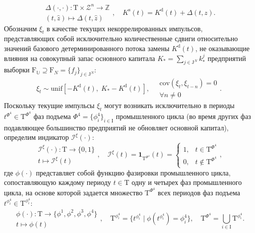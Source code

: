 \begin{equation}\begin{aligned} \Delta (\cdot, \cdot) : \mathrm{T} \times \mathcal{Z}^{n} \longrightarrow \mathbb{Z} \\ (t, \hat{z}) \longmapsto \Delta (t, \hat{z}) \end{aligned}, \quad K^{\mathrm{s}}(t) = K^{\mathrm{d}}(t) + \Delta (t, \hat{z}).\end{equation}
Обозначим $\xi_{t}$ в качестве текущих некоррелированных импульсов, представляющих собой исключительно количественные сдвиги относительно значений базового детерминированного потока замены $K^{\mathrm{d}}(t)$, не оказывающие влияния на совокупный запас основного капитала $K_{*} = \sum_{j \in \mathrm{J}^{N}} k^{j}_{*}$ предприятий выборки $\mathrm{F}_{\mathbb{U}} \supseteq \mathrm F_N = \{f_j\}_{j \in \mathrm{J}^{N}}$:
\begin{equation}\xi_{t} \sim \mathrm{unif} \left[-K^{\mathrm{d}}(t), \; K_{*} - K^{\mathrm{d}}(t) \right], \quad \begin{aligned} \mathrm{cov}(\xi_t,\xi_{t-n})=0 \\ \forall n\neq 0 \end{aligned}.\end{equation}
Поскольку текущие импульсы $\xi_{t}$ могут возникать исключительно в периоды $t^{\Phi^{4}} \in \mathrm{T}^{\Phi^{4}}$ фаз подъема $\Phi^{4} = \{\phi^{4}_{i}\}_{i \in \mathrm{I}}$ промышленного цикла (во время других фаз подавляющее большинство предприятий не обновляет основной капитал), определим индикатор $\mathcal{I}^{\xi}(\cdot)$:
\begin{equation}\begin{aligned} \mathcal{I}^{\xi}(\cdot) : \mathrm{T} \longrightarrow \{0,1\} \\ t \longmapsto \mathcal{I}^{\xi}(t) \end{aligned}, \quad \mathcal{I}^{\xi}(t) = \mathbf{1}_{\mathrm{T}^{\Phi^{4}}}(t) = \begin{cases} 1, &t \in \mathrm{T}^{\Phi^{4}} \\ 0, &t \not\in \mathrm{T}^{\Phi^{4}} \end{cases},\end{equation}
где $\phi(\cdot)$ представляет собой функцию фазировки промышленного цикла, сопоставляющую каждому периоду $t \in \mathrm{T}$ одну и четырех фаз промышленного цикла, на основе которой задается множество $\mathrm{T}^{\Phi^{4}}$ всех периодов фаз подъема $t^{\phi^{4}_{i}} \in \mathrm{T}^{\phi^{4}_{i}}$:
\begin{equation}\begin{aligned} \phi(\cdot) : \mathrm{T} \longrightarrow \{\phi^{1}, \phi^{2}, \phi^{3}, \phi^{4} \} \\ t \longmapsto \phi(t) \end{aligned}, \quad \mathrm{T}^{\phi^{4}_{i}} = \{t^{\phi^{4}_{i}} \mid \phi(t^{\phi^{4}_{i}}) = \phi^{4}_{i}\}, \quad \mathrm{T}^{\Phi^{4}} = \bigcup_{i \in \mathrm{I}} \mathrm{T}^{\phi^{4}_{i}}.\end{equation}
